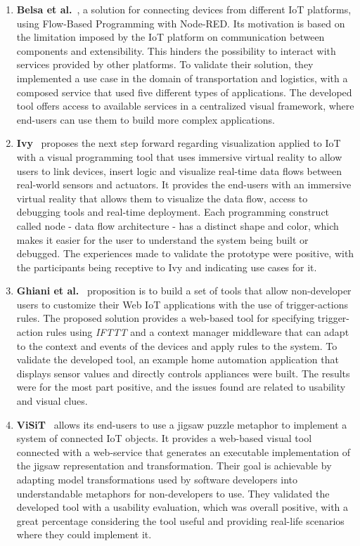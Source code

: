 \begin{enumerate}
    \item \textbf{Belsa et al.}~\cite{Belsa2018}, a solution for connecting devices from different IoT platforms, using Flow-Based Programming with Node-RED. Its motivation is based on the limitation imposed by the IoT platform on communication between components and extensibility. This hinders the possibility to interact with services provided by other platforms. To validate their solution, they implemented a use case in the domain of transportation and logistics, with a composed service that used five different types of applications. The developed tool offers access to available services in a centralized visual framework, where end-users can use them to build more complex applications.
    \item \textbf{Ivy}~\cite{ivy} proposes the next step forward regarding visualization applied to IoT with a visual programming tool that uses immersive virtual reality to allow users to link devices, insert logic and visualize real-time data flows between real-world sensors and actuators. It provides the end-users with an immersive virtual reality that allows them to visualize the data flow, access to debugging tools and real-time deployment. Each programming construct called node - data flow architecture - has a distinct shape and color, which makes it easier for the user to understand the system being built or debugged. The experiences made to validate the prototype were positive, with the participants being receptive to Ivy and indicating use cases for it.
    \item \textbf{Ghiani et al.}~\cite{personalization_of_context_dependent_apps} proposition is to build a set of tools that allow non-developer users to customize their Web IoT applications with the use of trigger-actions rules. The proposed solution provides a web-based tool for specifying trigger-action rules using \textit{IFTTT} and a context manager middleware that can adapt to the context and events of the devices and apply rules to the system. To validate the developed tool, an example home automation application that displays sensor values and directly controls appliances were built. The results were for the most part positive, and the issues found are related to usability and visual clues.
    \item \textbf{ViSiT}~\cite{visit} allows its end-users to use a jigsaw puzzle metaphor to implement a system of connected IoT objects. It provides a web-based visual tool connected with a web-service that generates an executable implementation of the jigsaw representation and transformation. Their goal is achievable by adapting model transformations used by software developers into understandable metaphors for non-developers to use. They validated the developed tool with a usability evaluation, which was overall positive, with a great percentage considering the tool useful and providing real-life scenarios where they could implement it.

\end{enumerate}
